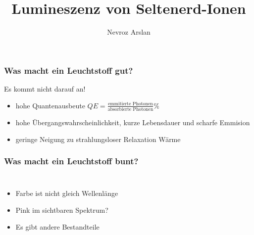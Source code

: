 \documentclass{beamer}
\title{Lumineszenz von Seltenerd-Ionen}
\author{Nevroz Arslan}
\newcommand{\makemycolor}[2]{%
    \pgfmathsetmacro{\hue}{(#1/100)^1.715*0.79}%
    \definecolor{myhsbcolor}{hsb}{\hue,1,1}%
    \textcolor{myhsbcolor}{#2}%
}
\begin{document}
  {%
    \frame{\titlepage}
  }

\begin{frame}[t]\frametitle{Was macht ein Leuchtstoff gut?}
Es kommt nicht darauf an!
\begin{itemize}
   \item hohe Quantenausbeute $QE = \frac{\text{emmitierte \ Photonen}}{\text{absorbierte Photonen}}\%$
   \item hohe Übergangswahrscheinlichkeit, kurze Lebensdauer und scharfe Emmision 
   \item geringe Neigung zu strahlungsloser Relaxation  Wärme
\end{itemize}
   
\end{frame}

\begin{frame}[t]\frametitle{Was macht ein Leuchtstoff bunt?}
\begin{columns}
    \begin{itemize}
    \item Farbe ist nicht gleich Wellenlänge
    \item Pink im sichtbaren Spektrum? 
    \item Es gibt andere Bestandteile
    \end{itemize}

\end{columns}

\end{frame}


 
\end{document}
